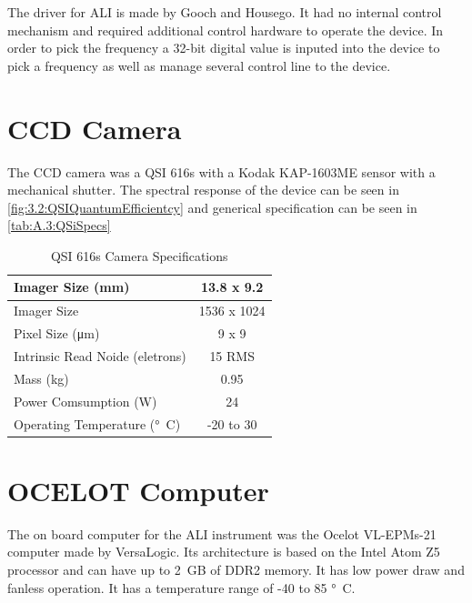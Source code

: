 The driver for ALI is made by Gooch and Housego. It had no internal control mechanism and required additional control hardware to operate the device. In order to pick the frequency a 32-bit digital value is inputed into the device to pick a frequency as well as manage several control line to the device.

\section{CCD Camera}

The CCD camera was a QSI 616s with a Kodak KAP-1603ME sensor with a mechanical shutter. The spectral response of the device can be seen in \autoref{fig:3.2:QSIQuantumEfficientcy} and generical specification can be seen in \autoref{tab:A.3:QSiSpecs}

\begin{table}
    \begin{center}
    \begin{tabular}{|l|c|}
    \hline
    Imager Size (mm) & 13.8 x 9.2 \\
    \hline
    Imager Size & 1536 x 1024 \\
    \hline
    Pixel Size (\si{\micro\meter}) & 9 x 9 \\
    \hline
    Intrinsic Read Noide (eletrons) & 15 RMS \\
    \hline
    Mass (kg) & 0.95 \\
    \hline
    Power Comsumption (W) & 24 \\
    \hline
    Operating Temperature (\si{\degree C}) & -20 to 30 \\
    \hline
    \end{tabular}
    \end{center}
    \caption[QSI 616s Camera Specifications]{QSI 616s Camera Specifications}
    \label{tab:A.3:QSISpecs}
\end{table}

\section{OCELOT Computer}

The on board computer for the ALI instrument was the Ocelot VL-EPMs-21 computer made by VersaLogic. Its architecture is based on the Intel Atom Z5 processor and can have up to 2~GB of DDR2 memory. It has low power draw and fanless operation. It has a temperature range of -40 to 85 \si{\degree C}.
